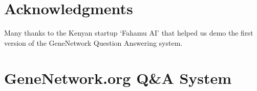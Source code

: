 \documentclass[letterpaper]{article}
\begin{document}
\section{ Acknowledgments}
Many thanks to the Kenyan startup `Fahamu AI' that helped us demo the first version of the GeneNetwork Question Answering system.


\begin{small}


\end{small}

\newpage
\appendix
\appendixpage
\section{GeneNetwork.org Q\&A System}

\end{document}
